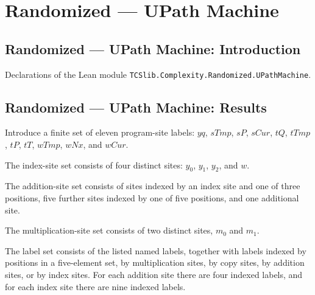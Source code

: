 \section{Randomized --- UPath Machine}
\subsection*{Randomized --- UPath Machine: Introduction}

Declarations of the Lean module \texttt{TCSlib.Complexity.Randomized.UPathMachine}.

\subsection*{Randomized --- UPath Machine: Results}

\begin{definition}
\label{Complexity.LogProg.CpSite}
\leanok
Introduce a finite set of eleven program-site labels: $yq$, $sTmp$, $sP$, $sCur$, $tQ$,
$tTmp$, $tP$, $tT$, $wTmp$, $wNx$, and $wCur$.
\end{definition}

\begin{definition}
\label{Complexity.LogProg.IxSite}
\leanok
The index-site set consists of four distinct sites: $y_0$, $y_1$, $y_2$, and $w$.
\end{definition}

\begin{definition}
\label{Complexity.LogProg.AdSite}
\leanok
{}
The addition-site set consists of sites indexed by an index site and one of three
positions, five further sites indexed by one of five positions, and one additional site.
\end{definition}

\begin{definition}
\label{Complexity.LogProg.MulSite}
\leanok
The multiplication-site set consists of two distinct sites, $m_0$ and $m_1$.
\end{definition}

\begin{definition}
\label{Complexity.LogProg.ULabel}
\leanok
{}
The label set consists of the listed named labels, together with labels indexed by
positions in a five-element set, by multiplication sites, by copy sites, by addition
sites, or by index sites. For each addition site there are four indexed labels, and for
each index site there are nine indexed labels.
\end{definition}

